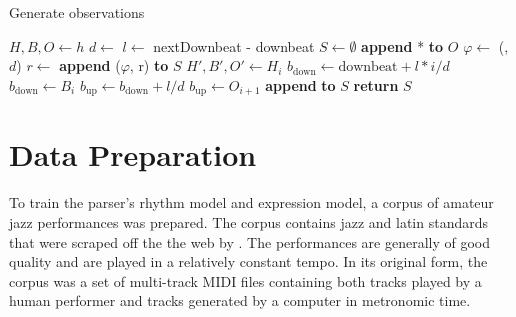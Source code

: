 \begin{algorithm}
\caption{Generate observations}
\label{alg:observations}
\begin{algorithmic}
	\State $H, B, O \leftarrow h$
	\State $d \leftarrow$ 
	\State $l \leftarrow$ nextDownbeat - downbeat
	\State $S \leftarrow \emptyset$
	\State \textbf{append} * \textbf{to} $O$
			\State $\varphi \leftarrow$ (, $d$)
			\State $r \leftarrow$ 
			\State \textbf{append} ($\varphi$, r) \textbf{to} $S$
		\EndIf	
		\State $H', B', O' \leftarrow H_i$
			\State $b_{\mathrm{down}} \leftarrow \mathrm{downbeat} + l * i/d$
				\State $b_{\mathrm{down}} \leftarrow B_i$
			\EndIf
			\State $b_{\mathrm{up}} \leftarrow b_{\mathrm{down}} + l/d$
				\State $b_{\mathrm{up}} \leftarrow O_{i+1}$
			\EndIf
			\State \textbf{append}  \textbf{to} $S$
		\EndIf
	\EndFor
	\State \textbf{return} $S$
\EndFunction
\end{algorithmic}
\end{algorithm}








\section{Data Preparation}
\label{sec:corpus}

To train the parser's rhythm model and expression model, a corpus of amateur jazz performances was prepared. The corpus contains jazz and latin standards that were scraped off the the web by \citet{Wild:10}. The performances are generally of good quality and are played in a relatively constant tempo. In its original form, the corpus was a set of multi-track MIDI files containing both tracks played by a human performer and tracks generated by a computer in metronomic time.


